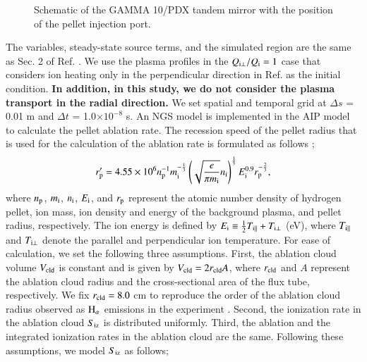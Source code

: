 \documentclass{jasse}%
\begin{document}
    \begin{figure}
        \centering
        
        \caption{Schematic of the GAMMA 10/PDX tandem mirror with the position of the pellet injection port.} \label{fig_G10}
    \end{figure}

    The variables, steady-state source terms, and the simulated region are the same as Sec. 2 of Ref. \cite{togo22}. We use the plasma profiles in the $Q_{\rm{i\bot}} / Q_{\rm{i}} = 1$ case that considers ion heating only in the perpendicular direction in Ref. \cite{togo22} as the initial condition.
    \textbf{In addition, in this study, we do not consider the plasma transport in the radial direction.} We set spatial and temporal grid at $\Delta s$ = 0.01 m and $\Delta t$ = 1.0$\times 10^{-8}$ s.
    An NGS model is implemented in the AIP model to calculate the pellet ablation rate. The recession speed of the pellet radius that is used for the calculation of the ablation rate is formulated as follows \cite{nakamura86}; 
\begin{equation}
    r'_{\rm{p}} = 4.55 \times 10^{6} n^{\rm{-1}}_{\rm{p}}m^{-\frac{1}{3}}_{\rm{i}}
    \left(\sqrt{\frac{e}{\pi m_{\rm{i}}}}n_{\rm{i}} \right)^{\frac{1}{3}}E^{0.9}_{\rm{i}}
    r^{-\frac{2}{3}}_{\rm{p}},
\end{equation}
    where $n_{\rm{p}}$, $m_{\rm{i}}$, $n_{\rm{i}}$, $E_{\rm{i}}$, and $r_{\rm{p}}$ represent the atomic number density of hydrogen pellet, ion mass, ion density and energy of the background plasma, and pellet radius, respectively. The ion energy is defined by $E_{\rm{i}} \equiv \frac{1}{2}T_{\rm{i\parallel}} + T_{\rm{i\bot}}$ (eV), where $T_{\rm{i\parallel}}$ and $T_{\rm{i\bot}}$ denote the parallel and perpendicular ion temperature. For ease of calculation, we set the following three assumptions. First, the ablation cloud volume $V_{\rm{cld}}$ is constant and is given by $V_{\rm{cld}} = 2r_{\rm{cld}}A$, where $r_{\rm{cld}}$ and $A$ represent the ablation cloud radius and the cross-sectional area of the flux tube, respectively. We fix $r_{\rm{cld}} = 8.0$ cm to reproduce the order of the ablation cloud radius observed as $\rm{H}_{\alpha}$ emissions in the experiment \cite{yoshikawa24}. Second, the ionization rate in the ablation cloud $S_{\rm{iz}}$ is distributed uniformly. Third, the ablation and the integrated ionization rates in the ablation cloud are the same. Following these assumptions, we model $S_{\rm{iz}}$ as follows;
\end{document}
